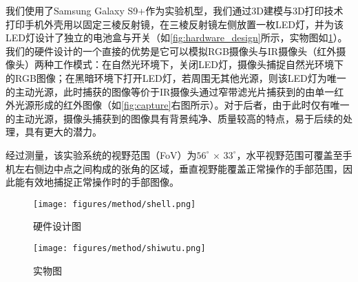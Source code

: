 我们使用了Samsung Galaxy S9+作为实验机型，我们通过3D建模与3D打印技术打印手机外壳用以固定三棱反射镜，在三棱反射镜左侧放置一枚LED灯，并为该LED灯设计了独立的电池盒与开关（如\ref{fig:hardware_design}所示，实物图如\ref{fig:hardware_real}）。我们的硬件设计的一个直接的优势是它可以模拟RGB摄像头与IR摄像头（红外摄像头）两种工作模式：在自然光环境下，关闭LED灯，摄像头捕捉自然光环境下的RGB图像；在黑暗环境下打开LED灯，若周围无其他光源，则该LED灯为唯一的主动光源，此时捕获的图像等价于IR摄像头通过窄带滤光片捕获到的由单一红外光源形成的红外图像（如\ref{fig:capture}右图所示）。对于后者，由于此时仅有唯一的主动光源，摄像头捕获到的图像具有背景纯净、质量较高的特点，易于后续的处理，具有更大的潜力。

经过测量，该实验系统的视野范围（FoV）为$56^{\circ}$ $\times$ $33^{\circ}$，水平视野范围可覆盖至手机左右侧边中点之间构成的张角的区域，垂直视野能覆盖正常操作的手部范围，因此能有效地捕捉正常操作时的手部图像。


\begin{figure}
\begin{minipage}[t]{0.5\linewidth}
\centering
\texttt{[image: figures/method/shell.png]}
\caption{硬件设计图}
\label{fig:hardware_design}
\end{minipage}%
\begin{minipage}[t]{0.5\linewidth}
\centering
\texttt{[image: figures/method/shiwutu.png]}
\caption{实物图}
\label{fig:hardware_real}
\end{minipage}
\end{figure}